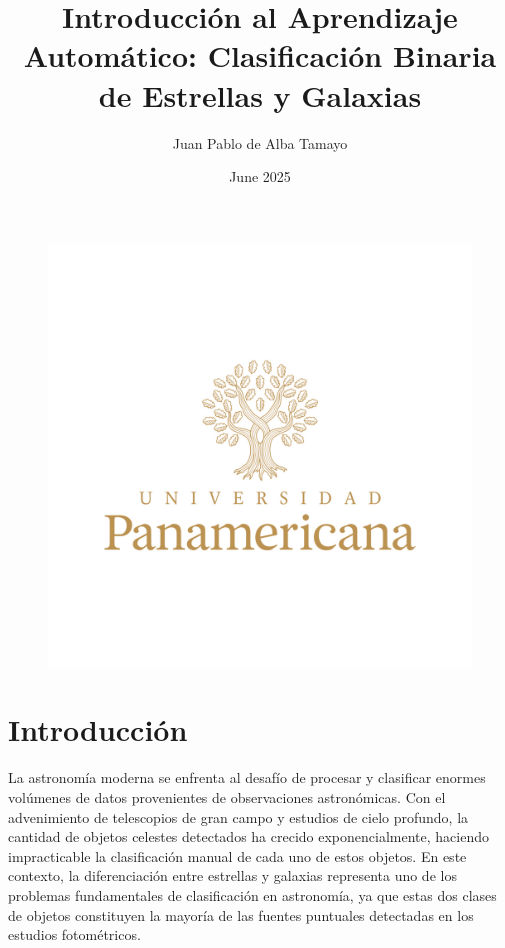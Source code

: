 \documentclass{article}
\title{Introducción al Aprendizaje Automático: Clasificación Binaria de Estrellas y Galaxias}
\author{Juan Pablo de Alba Tamayo}
\date{June 2025}
\begin{document}
\begin{figure}[H]
    \centering
    \includegraphics[width=0.75\linewidth]{logo.png}
\end{figure}

\newpage

\maketitle

\newpage

\tableofcontents

\newpage

\listoffigures

\newpage

\listoftables

\newpage

\section{Introducción}

La astronomía moderna se enfrenta al desafío de procesar y clasificar enormes volúmenes de datos provenientes de observaciones astronómicas. Con el advenimiento de telescopios de gran campo y estudios de cielo profundo, la cantidad de objetos celestes detectados ha crecido exponencialmente, haciendo impracticable la clasificación manual de cada uno de estos objetos. En este contexto, la diferenciación entre estrellas y galaxias representa uno de los problemas fundamentales de clasificación en astronomía, ya que estas dos clases de objetos constituyen la mayoría de las fuentes puntuales detectadas en los estudios fotométricos.
\end{document}
